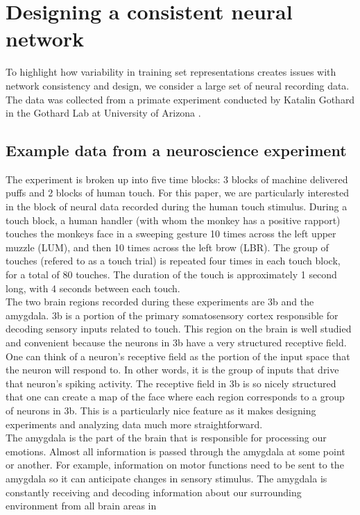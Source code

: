 \documentclass[12pt]{article}
\begin{document}
\section{Designing a consistent neural network}
To highlight how variability in training set representations creates issues with network consistency and design, we consider a large set of neural recording data. The data was collected from a primate experiment conducted by Katalin Gothard in the Gothard Lab at University
of Arizona \cite{lab}.
\subsection{Example data from a neuroscience experiment}The experiment is broken up into five time blocks: 3 blocks of machine delivered puffs and 2 blocks of human touch. For this paper, we are particularly interested in the block of neural data recorded during the human touch stimulus. During a touch block, a human handler (with whom the monkey has a positive rapport) touches the monkeys face in a sweeping gesture 10 times across the left upper muzzle (LUM), and then 10 times across the left brow (LBR). The group of touches (refered to as a touch trial) is repeated four times in each touch block, for a total of 80 touches. The duration of the touch is approximately 1 second long, with 4 seconds between each touch.  \\
\indent The two brain regions recorded during these experiments are 3b and the amygdala. 3b is a portion of the primary somatosensory cortex responsible for decoding sensory inputs related to touch. This region on the brain is well studied and convenient because the neurons in 3b have a very structured receptive field. One can think of a neuron's receptive field as the portion of the input space that the neuron will respond to. In other words, it is the group of inputs that drive that neuron's spiking activity. The receptive field in 3b is so nicely structured that one can create a map of the face where each region corresponds to a group of neurons in 3b. This is a particularly nice feature as it makes designing experiments and analyzing data much more straightforward. \\
\indent The amygdala is the part of the brain that is responsible for processing our
emotions. Almost all information is passed through the amygdala at some point or
another. For example, information on motor functions need to be sent to the amygdala
so it can anticipate changes in sensory stimulus. The amygdala is
constantly receiving and decoding information about our surrounding environment from all brain areas in
\end{document}

